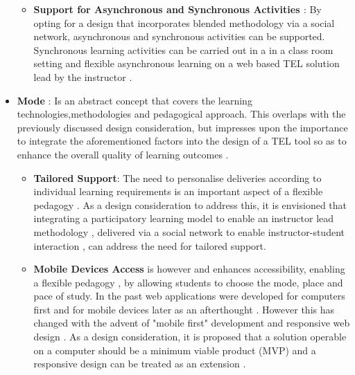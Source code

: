 \begin{itemize}[\null]
\begin{itemize}
\newpage


\item \textbf{Support for Asynchronous and Synchronous Activities \cite{Gordon2014}}: By opting for a design that incorporates blended methodology via a social network, asynchronous and synchronous activities can be supported. Synchronous learning activities can be carried out in a in a class room setting and flexible asynchronous learning on a web based TEL solution lead by the instructor \cite{Gordon2014}.

\end{itemize}

\item \textbf{Mode} : Is an abstract concept that covers the learning technologies,methodologies and pedagogical approach. This overlaps with the previously discussed design consideration, but impresses upon the importance to integrate the aforementioned factors into the design of a TEL tool \cite{Gordon2014} so as to enhance the overall quality of learning outcomes \cite{Cubukcuo2012}.

\begin{itemize}
\item \textbf{Tailored Support}: The need to personalise deliveries according to individual learning requirements is an important aspect of a flexible pedagogy \cite{Gordon2014}. As a design consideration to address this, it is envisioned that  integrating a participatory learning model \cite{Yager1990,Yager2004} to enable an instructor lead methodology \cite{RickReis,Team2008}, delivered via a social network to enable instructor-student interaction \cite{Cubukcuo2012}, can address the need for tailored support.



\item \textbf{Mobile Devices Access} is however  and enhances accessibility, enabling a flexible pedagogy \cite{Gordon2014}, by allowing students to choose the mode, place and pace of study. In the past web applications were  developed for computers first and for mobile devices later as an afterthought \cite{W3.CSS2016}. However this has changed with the advent of "mobile first" development and responsive web design \cite{W3.CSS2016}. As a design consideration, it is proposed that a solution operable on a computer should be a minimum viable product (MVP) and a responsive design can be treated as an extension \cite{W3.CSS2016}.
\end{itemize}
\end{itemize}




